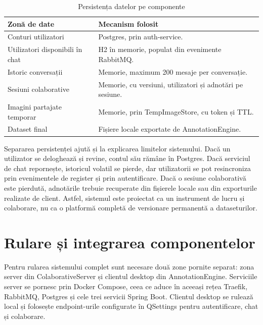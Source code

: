 \begin{table}[!htbp]
    \centering
    \small
    \begin{tabular}{p{} p{}}
        \hline
        Zonă de date & Mecanism folosit \\
        \hline
        Conturi utilizatori & Postgres, prin auth-service. \\
        Utilizatori disponibili în chat & H2 în memorie, populat din evenimente RabbitMQ. \\
        Istoric conversații & Memorie, maximum 200 mesaje per conversație. \\
        Sesiuni colaborative & Memorie, cu versiuni, utilizatori și adnotări pe sesiune. \\
        Imagini partajate temporar & Memorie, prin TempImageStore, cu token și TTL. \\
        Dataset final & Fișiere locale exportate de AnnotationEngine. \\
        \hline
    \end{tabular}
    \caption{Persistența datelor pe componente}
    \label{tab:persistenta-date-backend}
\end{table}

Separarea persistenței ajută și la explicarea limitelor sistemului. Dacă un utilizator se deloghează și revine, contul său rămâne în Postgres. Dacă serviciul de chat repornește, istoricul volatil se pierde, dar utilizatorii se pot resincroniza prin evenimentele de register și prin autentificare. Dacă o sesiune colaborativă este pierdută, adnotările trebuie recuperate din fișierele locale sau din exporturile realizate de client. Astfel, sistemul este proiectat ca un instrument de lucru și colaborare, nu ca o platformă completă de versionare permanentă a dataseturilor.

\section{Rulare și integrarea componentelor}

Pentru rularea sistemului complet sunt necesare două zone pornite separat: zona server din ColaborativeServer și clientul desktop din AnnotationEngine. Serviciile server se pornesc prin Docker Compose, ceea ce aduce în aceeași rețea Traefik, RabbitMQ, Postgres și cele trei servicii Spring Boot. Clientul desktop se rulează local și folosește endpoint-urile configurate în QSettings pentru autentificare, chat și colaborare.

